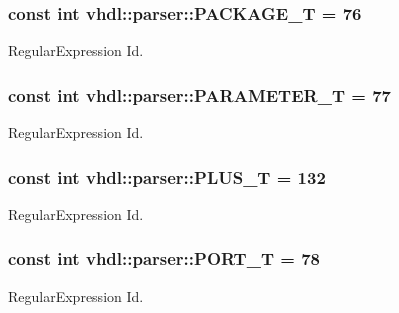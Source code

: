 \subsubsection[{P\+A\+C\+K\+A\+G\+E\+\_\+\+T}]{\setlength{\rightskip}{0pt plus 5cm}const int vhdl\+::parser\+::\+P\+A\+C\+K\+A\+G\+E\+\_\+\+T = 76}\label{namespacevhdl_1_1parser_a913d1328c0f77f429ffaf516fb9b645d}
Regular\+Expression Id. \hypertarget{namespacevhdl_1_1parser_a5385cb4229366f0ffc93dcf09d8ece71}{}
\subsubsection[{P\+A\+R\+A\+M\+E\+T\+E\+R\+\_\+\+T}]{\setlength{\rightskip}{0pt plus 5cm}const int vhdl\+::parser\+::\+P\+A\+R\+A\+M\+E\+T\+E\+R\+\_\+\+T = 77}\label{namespacevhdl_1_1parser_a5385cb4229366f0ffc93dcf09d8ece71}
Regular\+Expression Id. \hypertarget{namespacevhdl_1_1parser_a577f52050058b86512cb55f0ad9e54c1}{}
\subsubsection[{P\+L\+U\+S\+\_\+\+T}]{\setlength{\rightskip}{0pt plus 5cm}const int vhdl\+::parser\+::\+P\+L\+U\+S\+\_\+\+T = 132}\label{namespacevhdl_1_1parser_a577f52050058b86512cb55f0ad9e54c1}
Regular\+Expression Id. \hypertarget{namespacevhdl_1_1parser_a8d427205b7654e116f025b93c61888ea}{}
\subsubsection[{P\+O\+R\+T\+\_\+\+T}]{\setlength{\rightskip}{0pt plus 5cm}const int vhdl\+::parser\+::\+P\+O\+R\+T\+\_\+\+T = 78}\label{namespacevhdl_1_1parser_a8d427205b7654e116f025b93c61888ea}
Regular\+Expression Id. \hypertarget{namespacevhdl_1_1parser_a4ab70c303b2c7435cb9b276be3bad171}{}
